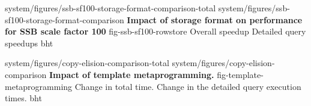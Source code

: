 %
%
%

\twoabfigures
{system/figures/ssb-sf100-storage-format-comparison-total}
{system/figures/ssb-sf100-storage-format-comparison}
{\textbf{Impact of storage format on performance for SSB scale factor 100\vspace*{3em}}}
{fig-ssb-sf100-rowstore}
{Overall speedup}
{Detailed query speedups}
{bht}

\twoabfigures
{system/figures/copy-elision-comparison-total}
{system/figures/copy-elision-comparison}
{\textbf{Impact of template metaprogramming.}}
{fig-template-metaprogramming}
{Change in total time.}
{Change in the detailed query execution times.}
{bht}

